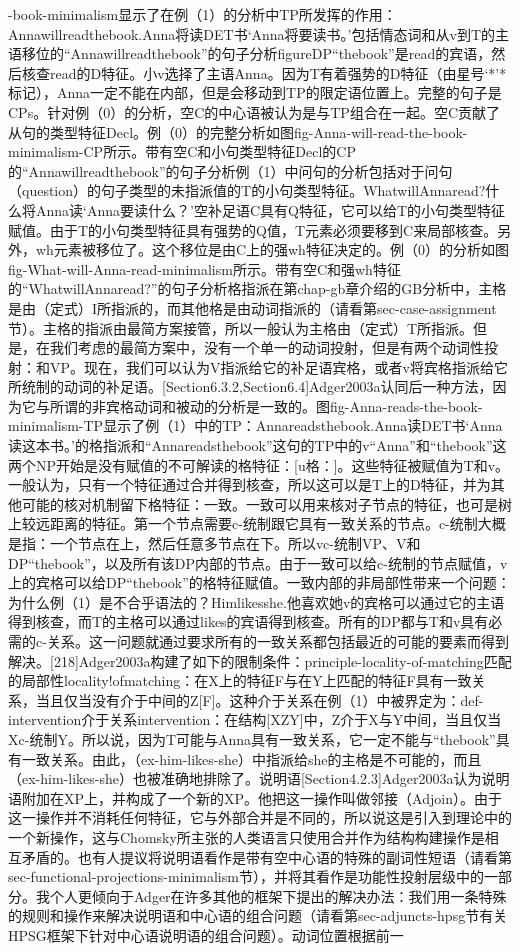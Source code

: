 -book-minimalism显示了在例（1）的分析中TP所发挥的作用：Annawillreadthebook.Anna将读DET书`Anna将要读书。'包括情态词和从v到T的主语移位的“Annawillreadthebook”的句子分析figureDP“thebook”是read的宾语，然后核查read的D特征。小v选择了主语Anna。因为T有着强势的D特征（由星号`*'*标记），Anna一定不能在内部，但是会移动到TP的限定语位置上。完整的句子是CPs。针对例（0）的分析，空C的中心语被认为是与TP组合在一起。空C贡献了从句的类型特征Decl。例（0）的完整分析如图fig-Anna-will-read-the-book-minimalism-CP所示。带有空C和小句类型特征Decl的CP的“Annawillreadthebook”的句子分析例（1）中问句的分析包括对于问句（question）的句子类型的未指派值的T的小句类型特征。WhatwillAnnaread?什么将Anna读`Anna要读什么？'空补足语C具有Q特征，它可以给T的小句类型特征赋值。由于T的小句类型特征具有强势的Q值，T元素必须要移到C来局部核查。另外，wh元素被移位了。这个移位是由C上的强wh特征决定的。例（0）的分析如图fig-What-will-Anna-read-minimalism所示。带有空C和强wh特征的“WhatwillAnnaread?”的句子分析格指派在第chap-gb章介绍的GB分析中，主格是由（定式）I所指派的，而其他格是由动词指派的（请看第sec-case-assignment节）。主格的指派由最简方案接管，所以一般认为主格由（定式）T所指派。但是，在我们考虑的最简方案中，没有一个单一的动词投射，但是有两个动词性投射：和VP。现在，我们可以认为V指派给它的补足语宾格，或者v将宾格指派给它所统制的动词的补足语。[Section6.3.2,Section6.4]Adger2003a认同后一种方法，因为它与所谓的非宾格动词和被动的分析是一致的。图fig-Anna-reads-the-book-minimalism-TP显示了例（1）中的TP：Annareadsthebook.Anna读DET书`Anna读这本书。'的格指派和“Annareadsthebook”这句的TP中的v“Anna”和“thebook”这两个NP开始是没有赋值的不可解读的格特征：[u格：]。这些特征被赋值为T和v。一般认为，只有一个特征通过合并得到核查，所以这可以是T上的D特征，并为其他可能的核对机制留下格特征：一致。一致可以用来核对子节点的特征，也可是树上较远距离的特征。第一个节点需要c-统制跟它具有一致关系的节点。c-统制大概是指：一个节点在上，然后任意多节点在下。所以vc-统制VP、V和DP“thebook”，以及所有该DP内部的节点。由于一致可以给c-统制的节点赋值，v上的宾格可以给DP“thebook”的格特征赋值。一致内部的非局部性带来一个问题：为什么例（1）是不合乎语法的？Himlikesshe.他喜欢她v的宾格可以通过它的主语得到核查，而T的主格可以通过likes的宾语得到核查。所有的DP都与T和v具有必需的c-关系。这一问题就通过要求所有的一致关系都包括最近的可能的要素而得到解决。[218]Adger2003a构建了如下的限制条件：principle-locality-of-matching匹配的局部性locality!ofmatching：在X上的特征F与在Y上匹配的特征F具有一致关系，当且仅当没有介于中间的Z[F]。这种介于关系在例（1）中被界定为：def-intervention介于关系intervention：在结构[XZY]中，Z介于X与Y中间，当且仅当Xc-统制Y。所以说，因为T可能与Anna具有一致关系，它一定不能与“thebook”具有一致关系。由此，（ex-him-likes-she）中指派给she的主格是不可能的，而且（ex-him-likes-she）也被准确地排除了。说明语[Section4.2.3]Adger2003a认为说明语附加在XP上，并构成了一个新的XP。他把这一操作叫做邻接（Adjoin）。由于这一操作并不消耗任何特征，它与外部合并是不同的，所以说这是引入到理论中的一个新操作，这与Chomsky所主张的人类语言只使用合并作为结构构建操作是相互矛盾的。也有人提议将说明语看作是带有空中心语的特殊的副词性短语（请看第sec-functional-projections-minimalism节），并将其看作是功能性投射层级中的一部分。我个人更倾向于Adger在许多其他的框架下提出的解决办法：我们用一条特殊的规则和操作来解决说明语和中心语的组合问题（请看第sec-adjuncts-hpsg节有关HPSG框架下针对中心语说明语的组合问题）。动词位置根据前一